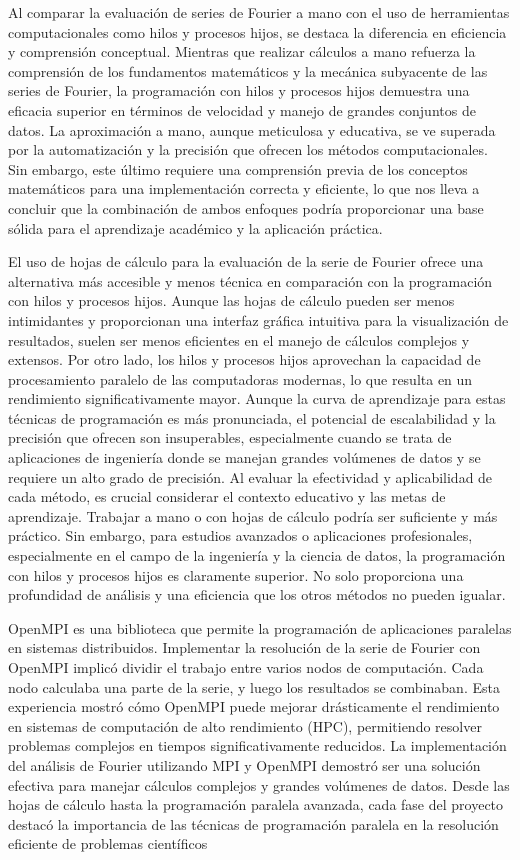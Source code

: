 Al comparar la evaluación de series de Fourier a mano con el uso de herramientas computacionales como hilos y procesos hijos, se destaca la diferencia en eficiencia y comprensión conceptual. Mientras que realizar cálculos a mano refuerza la comprensión de los fundamentos matemáticos y la mecánica subyacente de las series de Fourier, la programación con hilos y procesos hijos demuestra una eficacia superior en términos de velocidad y manejo de grandes conjuntos de datos. La aproximación a mano, aunque meticulosa y educativa, se ve superada por la automatización y la precisión que ofrecen los métodos computacionales. Sin embargo, este último requiere una comprensión previa de los conceptos matemáticos para una implementación correcta y eficiente, lo que nos lleva a concluir que la combinación de ambos enfoques podría proporcionar una base sólida para el aprendizaje académico y la aplicación práctica.

El uso de hojas de cálculo para la evaluación de la serie de Fourier ofrece una alternativa más accesible y menos técnica en comparación con la programación con hilos y procesos hijos. Aunque las hojas de cálculo pueden ser menos intimidantes y proporcionan una interfaz gráfica intuitiva para la visualización de resultados, suelen ser menos eficientes en el manejo de cálculos complejos y extensos. Por otro lado, los hilos y procesos hijos aprovechan la capacidad de procesamiento paralelo de las computadoras modernas, lo que resulta en un rendimiento significativamente mayor. Aunque la curva de aprendizaje para estas técnicas de programación es más pronunciada, el potencial de escalabilidad y la precisión que ofrecen son insuperables, especialmente cuando se trata de aplicaciones de ingeniería donde se manejan grandes volúmenes de datos y se requiere un alto grado de precisión. Al evaluar la efectividad y aplicabilidad de cada método, es crucial considerar el contexto educativo y las metas de aprendizaje. Trabajar a mano o con hojas de cálculo podría ser suficiente y más práctico. Sin embargo, para estudios avanzados o aplicaciones profesionales, especialmente en el campo de la ingeniería y la ciencia de datos, la programación con hilos y procesos hijos es claramente superior. No solo proporciona una profundidad de análisis y una eficiencia que los otros métodos no pueden igualar.


OpenMPI es una biblioteca que permite la programación de aplicaciones paralelas en sistemas distribuidos. Implementar la resolución de la serie de Fourier con OpenMPI implicó dividir el trabajo entre varios nodos de computación. Cada nodo calculaba una parte de la serie, y luego los resultados se combinaban. Esta experiencia mostró cómo OpenMPI puede mejorar drásticamente el rendimiento en sistemas de computación de alto rendimiento (HPC), permitiendo resolver problemas complejos en tiempos significativamente reducidos.
La implementación del análisis de Fourier utilizando MPI y OpenMPI demostró ser una solución efectiva para manejar cálculos complejos y grandes volúmenes de datos. Desde las hojas de cálculo hasta la programación paralela avanzada, cada fase del proyecto destacó la importancia de las técnicas de programación paralela en la resolución eficiente de problemas científicos